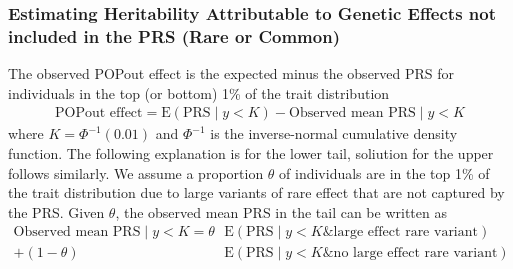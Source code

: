 \documentclass[12pt]{zHenriquesLab-StyleBioRxiv}
\newcommand{\E}{\mbox{E}}
\begin{document}
{{{%

\subsubsection*{Estimating Heritability Attributable to Genetic Effects not included in the PRS (Rare or Common)}
The observed POPout effect is the expected minus the observed PRS for
individuals in the top (or bottom) 1\% of the trait distribution
\begin{align}
  \mbox{POPout effect}  = \E(\mbox{PRS} \mid y<K)
  - \mbox{Observed mean PRS}  \mid y<K \label{popout}
\end{align}
where $K=\Phi^{-1}(0.01)$ and $\Phi^{-1}$ is the inverse-normal
cumulative density function. The following explanation is for the
lower tail, soliution for the upper follows similarly. We assume a
proportion $\theta$ of individuals are in the top 1\% of the trait
distribution due to large variants of rare effect that are not
captured by the PRS. Given $\theta$, the observed mean PRS in the tail
can be written as
\begin{align*}
  \mbox{Observed mean PRS} \mid y < K =
  \theta &\E( \mbox{PRS} \mid y<K \mbox{\& large
    effect rare variant})\\
    + (1-\theta) &\E( \mbox{PRS} \mid y<K  \mbox{\& no large
    effect rare variant})
\end{align*}

}}}
\end{document}
